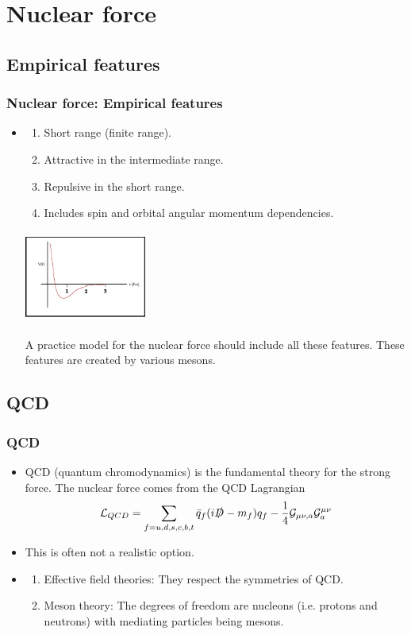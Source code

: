 \documentclass[10pt,serif]{beamer}
\begin{document}
\section{Nuclear force}
\subsection{Empirical features}
\begin{frame}
\frametitle{Nuclear force: Empirical features}
\begin{itemize}
\item {}
\begin{enumerate}
\item Short range (finite range).
\item Attractive in the intermediate range.
\item Repulsive in the short range.
\item Includes spin and orbital angular momentum dependencies.
\end{enumerate}
\begin{center}
\includegraphics[width=4cm,height=3cm]{Strong_Force.jpg}
\end{center}
\alert{A practice model for the nuclear force should include all these features}. These features are created by various mesons.
\end{itemize}
\end{frame}
\subsection{QCD}
\begin{frame}
\frametitle{QCD}
\begin{itemize}
\item QCD (quantum chromodynamics) is the fundamental theory for the strong force. The nuclear force comes from the QCD Lagrangian
\begin{equation}
\mathcal{L}_{QCD} = \sum_{f = u,d,s,c,b,t} \bar{q}_f (i\slashed{D} - m_f )q_f - \frac{1}{4} \mathcal{G}_{\mu \nu,a}\mathcal{G}^{\mu \nu}_a
\end{equation}
\item \alert{This is often not a realistic option}.
\item {}
\begin{enumerate}
\item Effective field theories: They respect the symmetries of QCD.
\item \alert{Meson theory}: The degrees of freedom are nucleons (i.e. protons and neutrons) with mediating particles being mesons.
\end{enumerate}
\end{itemize}
\end{frame}
\end{document}
